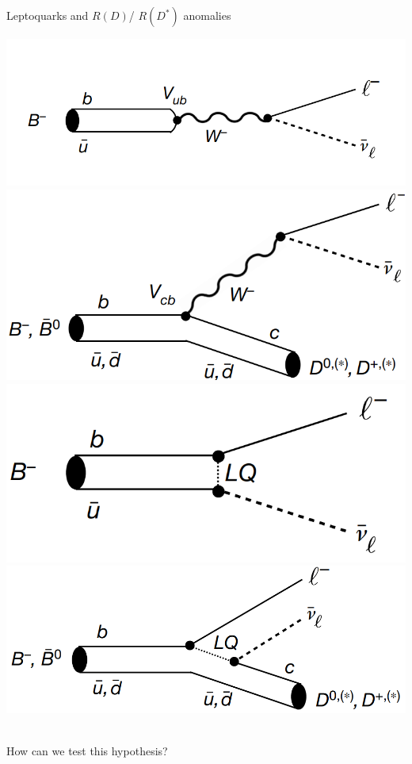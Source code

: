 \documentclass{../bredelebeamer}
\begin{document}
\begin{frame}{Leptoquarks and $R(D)$/ $R(D^*)$ anomalies}
	\begin{multicols}{2}
		\includegraphics[width=.99\linewidth]{B_SM_1.png}
		$$ $$
		\includegraphics[width=.99\linewidth]{B_SM_2.png}
		\pause
		\includegraphics[width=.99\linewidth]{B_LQ_1.png}
		$$ $$
		\includegraphics[width=.99\linewidth]{B_LQ_2.png}
	\end{multicols}
	\pause
	\begin{center}
		{\large $ $\\
		How can we test this hypothesis?
		}
	\end{center}
\end{frame}
\end{document}
